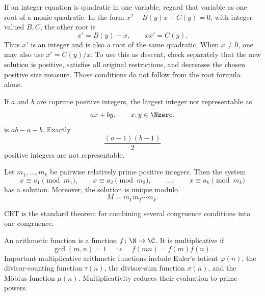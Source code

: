     \begin{strategy}
        If an integer equation is quadratic in one variable, regard that
        variable as one root of a monic quadratic. In the form
        $x^2-B(y)x+C(y)=0$, with integer-valued $B,C$, the other root is
        \[
            x'=B(y)-x,\qquad xx'=C(y).
        \]
        Thus $x'$ is an integer and is also a root of the same quadratic.
        When $x\neq0$, one may also use $x'=C(y)/x$. To use this as descent,
        check separately that the new solution is positive, satisfies all
        original restrictions, and decreases the chosen positive size
        measure. Those conditions do not follow from the root formula alone.
    \end{strategy}

    \begin{theorem}
        If $a$ and $b$ are coprime positive integers, the largest integer not
        representable as
        \[
            ax+by,
            \qquad
            x,y\in\Nzero,
        \]
        is $ab-a-b$. Exactly
        \[
            \frac{(a-1)(b-1)}{2}
        \]
        positive integers are not representable.
    \end{theorem}

    \begin{theorem}
        Let $m_1,\dots,m_k$ be pairwise relatively prime positive integers.
        Then the system
        \[
            x\equiv a_1\pmod {m_1},
            \qquad
            x\equiv a_2\pmod {m_2},
            \qquad
            \dots,
            \qquad
            x\equiv a_k\pmod {m_k}
        \]
        has a solution. Moreover, the solution is unique modulo
        \[
            M=m_1m_2\cdots m_k.
        \]
    \end{theorem}

    \begin{strategy}
        CRT is the standard theorem for combining several congruence conditions
        into one congruence.
    \end{strategy}

    \begin{definition}
        An arithmetic function is a function $f\colon \N\to\C$. It is
        multiplicative if
        \[
            \gcd(m,n)=1
            \quad\Longrightarrow\quad
            f(mn)=f(m)f(n).
        \]
        Important multiplicative arithmetic functions include Euler's totient
        $\varphi(n)$, the divisor-counting function $\tau(n)$, the
        divisor-sum function $\sigma(n)$, and the M\"obius function $\mu(n)$.
        Multiplicativity reduces their evaluation to prime powers.
    \end{definition}

